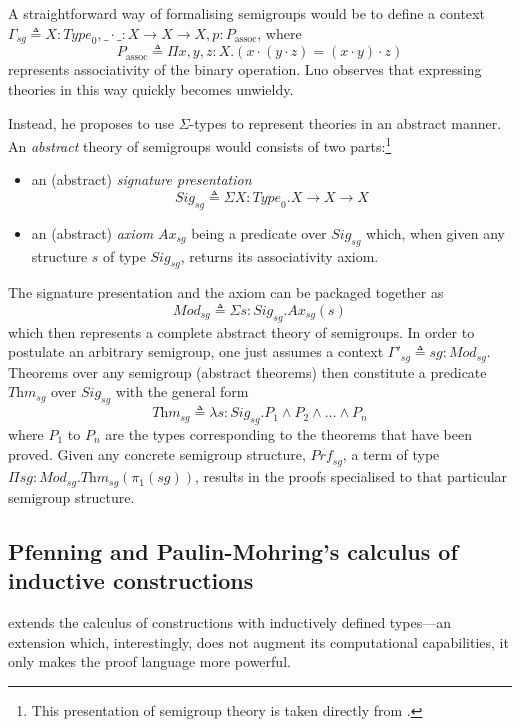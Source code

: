\documentclass[12pt,toc=bibliography,numbers=noendperiod,
               footnotes=multiple,twoside]{scrartcl}
\begin{document}
A straightforward way of formalising semigroups would be to define a context \(\Gamma_{sg} \triangleq X : \textit{Type}_0, \_\cdot\_ : X \rightarrow X \rightarrow X, p : P_\textrm{assoc}\), where \[P_\textrm{assoc} \triangleq \Pi x,y,z:X.(x \cdot (y \cdot z) = (x \cdot y) \cdot z)\] represents associativity of the binary operation. Luo observes that expressing theories in this way quickly becomes unwieldy.

Instead, he proposes to use \(\Sigma\)-types to represent theories in an abstract manner. An \emph{abstract} theory of semigroups would consists of two parts:\footnote{This presentation of semigroup theory is taken directly from \textcite[100]{luo_extended_1990}.}

\begin{itemize}
\item an (abstract) \emph{signature presentation} \[\textit{Sig}_{sg} \triangleq \Sigma X : \textit{Type}_0. X \rightarrow X \rightarrow X\]
\item an (abstract) \emph{axiom} \(\textit{Ax}_{sg}\) being a predicate over \(\textit{Sig}_{sg}\) which, when given any structure \(s\) of type \(\textit{Sig}_{sg}\), returns its associativity axiom.
\end{itemize}

The signature presentation and the axiom can be packaged together as \[\textit{Mod}_{sg} \triangleq \Sigma s : \textit{Sig}_{sg}. \textit{Ax}_{sg}(s)\] which then represents a complete abstract theory of semigroups. In order to postulate an arbitrary semigroup, one just assumes a context \(\Gamma'_{sg} \triangleq sg : \textit{Mod}_{sg}\). Theorems over any semigroup (abstract theorems) then constitute a predicate \(\textit{Thm}_{sg}\) over \(\textit{Sig}_{sg}\) with the general form \[\textit{Thm}_{sg} \triangleq \lambda s : \textit{Sig}_{sg}. P_1 \wedge P_2 \wedge \dots \wedge P_n\] where \(P_1\) to \(P_n\) are the types corresponding to the theorems that have been proved. Given any concrete semigroup structure, \(\textit{Prf}_{sg}\), a term of type \(\Pi sg : \textit{Mod}_{sg}. \textit{Thm}_{sg}(\pi_1(sg))\), results in the proofs specialised to that particular semigroup structure.

\subsection{Pfenning and Paulin-Mohring's calculus of inductive constructions}

\textcite{pfenning_inductively_1990} extends the calculus of constructions with inductively defined types---an extension which, interestingly, does not augment its computational capabilities, it only makes the proof language more powerful.
\end{document}
